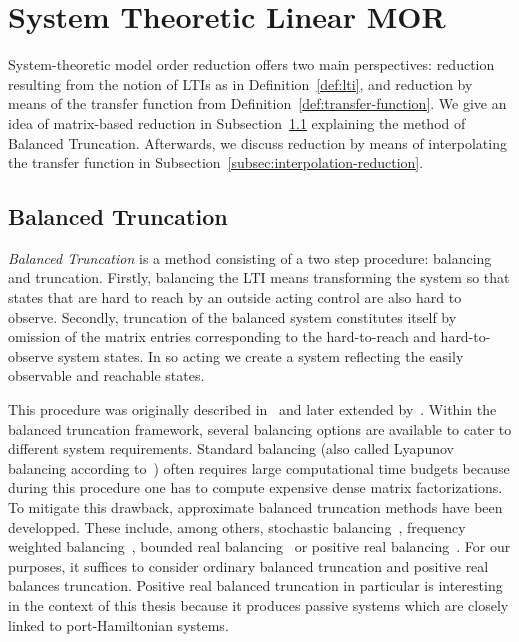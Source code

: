 \section{System Theoretic Linear MOR}\label{sec:system-mor}

System-theoretic model order reduction offers two main perspectives: reduction resulting from the notion of \acp{LTI} as in Definition~\ref{def:lti}, and reduction by means of the transfer function from Definition~\ref{def:transfer-function}.
We give an idea of matrix-based reduction in Subsection~\ref{subsec:balanced-truncation} explaining the method of Balanced Truncation.
Afterwards, we discuss reduction by means of interpolating the transfer function in Subsection~\ref{subsec:interpolation-reduction}.

\subsection{Balanced Truncation}\label{subsec:balanced-truncation}

\emph{Balanced Truncation} is a method consisting of a two step procedure: balancing and truncation.
Firstly, balancing the \ac{LTI} means transforming the system so that states that are hard to reach by an outside acting control are also hard to observe.
Secondly, truncation of the balanced system constitutes itself by omission of the matrix entries corresponding to the hard-to-reach and hard-to-observe system states.
In so acting we create a system reflecting the easily observable and reachable states.

This procedure was originally described in~\cite{Mullis1976} and later extended by~\cite{Moore1981, Enns1984}.
Within the balanced truncation framework, several balancing options are available to cater to different system requirements.
Standard balancing (also called Lyapunov balancing according to~\cite{Gugercin2007}) often requires large computational time budgets because during this procedure one has to compute expensive dense matrix factorizations.
To mitigate this drawback, approximate balanced truncation methods have been developped.
These include, among others, stochastic balancing~\cite{Desai1984, Green1988}, frequency weighted balancing~\cite{Enns1984, Wang1999}, bounded real balancing~\cite{Opdenacker1988, Reis2009} or positive real balancing~\cite{Desai1984, Ober1991}.
For our purposes, it suffices to consider ordinary balanced truncation and positive real balances truncation.
Positive real balanced truncation in particular is interesting in the context of this thesis because it produces passive systems which are closely linked to port-Hamiltonian systems.

